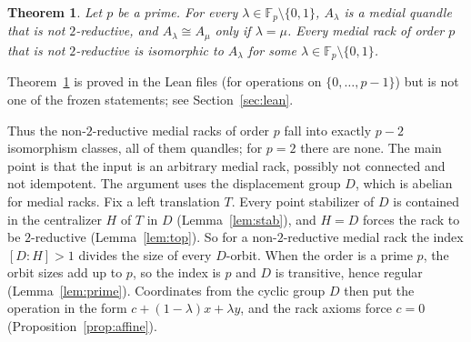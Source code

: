 \documentclass[11pt]{article}
\newtheorem{theorem}{Theorem}
\theoremstyle{definition}
\theoremstyle{remark}
\newcommand{\F}{\mathbb F}
\begin{document}
\begin{theorem}\label{thm:class}
Let $p$ be a prime. For every $\lambda\in\F_p\setminus\{0,1\}$, $A_\lambda$ is
a medial quandle that is not $2$-reductive, and $A_\lambda\cong A_\mu$ only if
$\lambda=\mu$. Every medial rack of order $p$ that is not $2$-reductive is
isomorphic to $A_\lambda$ for some $\lambda\in\F_p\setminus\{0,1\}$.
\end{theorem}

\noindent Theorem~\ref{thm:class} is proved in the Lean files (for operations
on $\{0,\dots,p-1\}$) but is not one of the frozen statements; see
Section~\ref{sec:lean}.

Thus the non-$2$-reductive medial racks of order $p$ fall into exactly $p-2$
isomorphism classes, all of them quandles; for $p=2$ there are none. The main
point is that the input is an arbitrary medial rack, possibly not connected and
not idempotent. The argument uses the displacement group $D$, which is abelian
for medial racks. Fix a left translation $T$. Every point stabilizer of $D$ is
contained in the centralizer $H$ of $T$ in $D$ (Lemma~\ref{lem:stab}), and
$H=D$ forces the rack to be $2$-reductive (Lemma~\ref{lem:top}). So for a
non-$2$-reductive medial rack the index $[D:H]>1$ divides the size of every
$D$-orbit. When the order is a prime $p$, the orbit sizes add up to $p$, so the
index is $p$ and $D$ is transitive, hence regular (Lemma~\ref{lem:prime}).
Coordinates from the cyclic group $D$ then put the operation in the form
$c+(1-\lambda)x+\lambda y$, and the rack axioms force $c=0$
(Proposition~\ref{prop:affine}).
\end{document}
